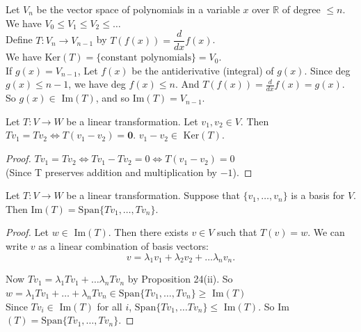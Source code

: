 \begin{example} Let $V_n$ be the vector space of polynomials in a variable $x$ over $\mathbb{R}$ of degree $\leq n$.\\

We have $V_0 \leq V_1 \leq V_2 \leq \dots$\\

Define $T: V_n \to V_{n-1}$ by $T(f(x)) = \dfrac{d}{dx} f(x)$. \\

We have Ker$(T) = \{\text{constant polynomials} \} = V_0$.\\

If $g(x) = V_{n-1}$, Let $f(x)$ be the antiderivative (integral) of $g(x)$. Since deg $g(x) \leq n-1$, we have deg $f(x) \leq n$. And $T(f(x)) = \frac{d}{dx}f(x) = g(x)$. \\

So $g(x) \in $ Im$(T)$, and so Im$(T) = V_{n-1}$.
\end{example}\vspace*{10pt}

\begin{proposition} Let $T : V \to W$ be a linear transformation. Let $v_1, v_2 \in V$. Then $Tv_1 = Tv_2 \iff T(v_1 -v_2) = \mathbf{0}$. $v_1 - v_2 \in $ Ker$(T)$.	
\end{proposition}


\begin{proof}
$Tv_1 = Tv_2 \iff Tv_1 - Tv_2 = 0 \iff T(v_1 - v_2) = 0$\\ (Since T preserves addition and multiplication by $-1$). 
\end{proof} \vspace{10pt}

\begin{proposition} Let $T: V \to W$ be a linear transformation. Suppose that $\{v_1, \dots, v_n\}$ is a basis for $V$. Then Im$(T) = \text{Span}\{Tv_1, \dots, Tv_n\}$.	
\end{proposition}


\begin{proof}
Let $w \in $ Im$(T)$. Then there exists $v \in V$ such that $T(v) = w$. We can write $v$ as a linear combination of basis vectors:\[v = \lambda_1v_1 + \lambda_2v_2 + \dots \lambda_nv_n. \]

Now $Tv_1 = \lambda_1 Tv_1 + \dots \lambda_n Tv_n$ by Proposition 24(ii). So $w = \lambda_1Tv_1 + \dots + \lambda_nTv_n \in \text{Span}\{Tv_1, \dots, Tv_n\} \geq $ Im$(T)$\\
 
 Since $Tv_i \in $ Im$(T)$ for all $i$, $\text{Span}\{Tv_1, \dots Tv_n\} \leq $ Im$(T)$. So Im$(T) = \text{Span}\{Tv_1, \dots, Tv_n\}.$
 \end{proof}
\vspace{10pt}

